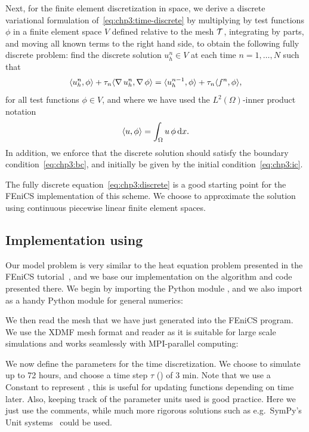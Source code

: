 Next, for the finite element discretization in space, we derive a
discrete variational formulation of~\eqref{eq:chp3:time-discrete} by
multiplying by test functions $\phi$ in a finite element space $V$
defined relative to the mesh $\mathcal{T}$, integrating by parts, and moving
all known terms to the right hand side, to obtain the following fully
discrete problem: find the discrete solution $u_h^n \in V$ at each
time $n = 1, \dots, N$ such that
\begin{equation}
  \label{eq:chp3:discrete}
  \langle u_h^n,\phi\rangle + \tau_n \langle \operatorname{\nabla} u_h^n,\operatorname{\nabla} \phi\rangle
  =  \langle u_h^{n-1},\phi\rangle + \tau_n \langle f^n,\phi\rangle,  
\end{equation}
for all test functions $\phi \in V$, and where we have used the
$L^2(\Omega)$-inner product notation
\begin{equation}
  \langle u,\phi\rangle = \int_{\Omega} u \, \phi \, \mathrm{d}x.
\end{equation}
In addition, we enforce that the discrete solution should satisfy the
boundary condition~\eqref{eq:chp3:bc}, and initially be given by the
initial condition~\eqref{eq:chp3:ic}. 

The fully discrete equation~\eqref{eq:chp3:discrete} is a good
starting point for the FEniCS implementation of this scheme. We choose
to approximate the solution using continuous piecewise linear finite
element spaces. 

\subsection{Implementation using {\fenics}}
\label{sec:chp3:fenics-code-implementation}

Our model problem is very similar to the heat equation problem
presented in the FEniCS tutorial~\cite[Chapter
  3.1]{langtangen2016solving}, and we base our implementation on the
algorithm and code presented there. We begin by importing the Python
module , and we also import 
as a handy Python module for general numerics:

\noindent We then read the mesh that we have just generated into the FEniCS
program. We use the XDMF mesh format and reader as it is suitable for
large scale simulations and works seamlessly with MPI-parallel computing:

\noindent We now define the parameters for the time discretization. We
choose to simulate up to 72 hours, and choose a time step $\tau$
() of 3 min. Note that we use a Constant to
represent , this is useful for updating functions
depending on time later. Also, keeping track of the parameter units
used is good practice. Here we just use the comments, while much more
rigorous solutions such as e.g.~SymPy's Unit
systems~\cite{meurer2017sympy} could be used.

